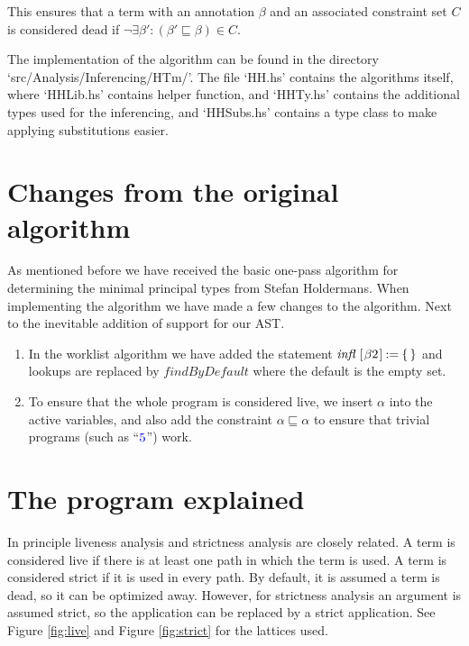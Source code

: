 \documentclass[a4paper,11pt]{article}
\newcommand{\Varid}[1]{\mathit{#1}}
\begin{document}
  This ensures that a term with an annotation $\beta$ and an associated
  constraint set $C$ is considered dead if $\neg \exists \beta' : (\beta'
  \sqsubseteq \beta) \in C$.
  
  The implementation of the algorithm can be found in the directory
  `src/Analysis/Inferencing/HTm/'. The file `HH.hs' contains the algorithms
  itself, where `HHLib.hs' contains helper function, and `HHTy.hs' contains
  the additional types used for the inferencing, and `HHSubs.hs' contains a
  type class to make applying substitutions easier.

\section{Changes from the original algorithm}
   As mentioned before we have received the basic one-pass algorithm for
   determining the minimal principal types from Stefan Holdermans. When
   implementing the algorithm we have made a few changes to the algorithm.
   Next to the inevitable addition of support for our AST.


  \begin{enumerate}
    \item In the worklist algorithm we have added the statement
          \ensuremath{\Varid{infl}\;[\mskip1.5mu \beta2\mskip1.5mu]\mathbin{:=}\{\mskip1.5mu \mskip1.5mu\}} and lookups are replaced by \ensuremath{\Varid{findByDefault}} where
          the default is the empty set.
    \item To ensure that the whole program is considered live, we insert \ensuremath{\alpha}
          into the active variables, and also add the constraint \ensuremath{\alpha\sqsubseteq\alpha} to
          ensure that trivial programs (such as ``\ensuremath{\color{numeral}{ 5 }}'') work.
  \end{enumerate}

\section{The program explained}
  In principle liveness analysis and strictness analysis are closely
  related. A term is considered live if there is at least one path in
  which the term is used. A term is considered strict if it is used in
  every path. By default, it is assumed a term is dead, so it can be
  optimized away. However, for strictness analysis an argument is assumed
  strict, so the application can be replaced by a strict application. See
  Figure \ref{fig:live} and Figure \ref{fig:strict} for the lattices used.
\end{document}
